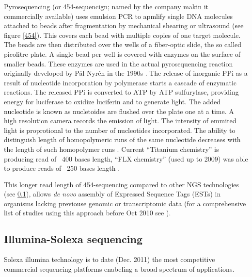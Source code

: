Pyrosequencing (or 454-sequencign; named by the company makin it
commercially available) uses emulsion PCR to apmlify single DNA
molecules attached to beads after fragmentation by mechanical shearing
or ultrasound \cite{pmid20298868} (see figure \ref{454}). This covers
each bead with multiple copies of one target molecule. The beads are
then distributed over the wells of a fiber-optic slide, the so called
picolitre plate. A single bead per well is covered with enzymes on the
surface of smaller beads. These enzymes are used in the actual
pyrosequencing reaction originally developed by P\r{a}l Nyr\'{e}n in
the 1990s \cite{pmid17185753}. The release of inorganic PPi as a
result of nucleotide incorporation by polymerase starts a cascade of
enzymatic reactions. The released PPi is converted to ATP by ATP
sulfurylase, providing energy for luciferase to oxidize luciferin and
to generate light. The added nucleotide is known as nucletoides are
flushed over the plate one at a time. A high resolution camera records
the emission of light. The intensity of emmited light is proprotional
to the number of nucleotides incorporated. The ability to distinguish
length of homopolymeric runs of the same nucleotide decreases with the
length of such homopolymer runs \cite{pmid21685085}. Current
``Titanium chemistry'' is producing read of ~400 bases length, ``FLX
chemistry'' (used up to 2009) was able to produce reads of ~250 bases
length \cite{pmid21514329}.

This longer read length of 454-sequencing \cite{pmid16056220} compared
to other NGS technologies (see \ref{sec:ill-seq}), allows \textit{de
  novo} assembly of Expressed Sequence Tags (ESTs) in organisms
lacking previouse genomic or transcriptomic data (for a comprehensive
list of studies using this approach before Oct 2010 see
\cite{pmid20950480}).

\subsection{Illumina-Solexa sequencing}
\label{sec:ill-seq}

Solexa illumina technology is to date (Dec. 2011) the most competitive
commercial sequencing platforms enabeling a broad spectrum of
applications.


